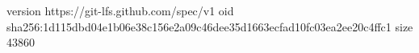 version https://git-lfs.github.com/spec/v1
oid sha256:1d115dbd04e1b06e38c156e2a09c46dee35d1663ecfad10fc03ea2ee20c4ffc1
size 43860
